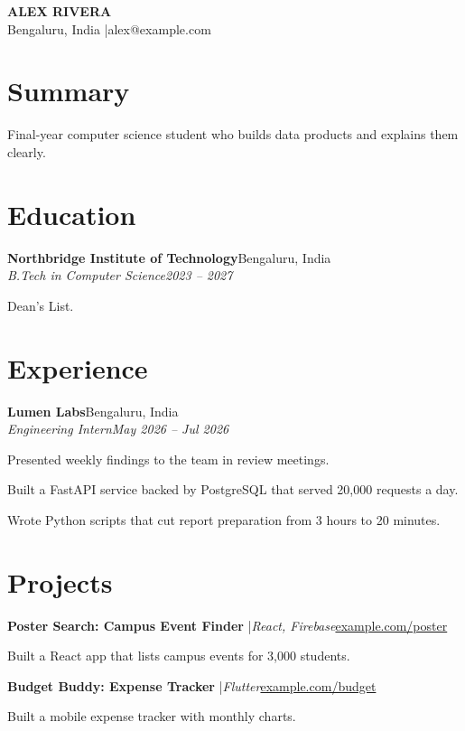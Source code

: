 \documentclass[a4paper,10pt]{article}
\begin{document}
\begin{center}
{\LARGE\bfseries ALEX RIVERA}\\[4pt]
Bengaluru, India \enspace|\enspace alex@example.com
\end{center}

\section{Summary}
Final-year computer science student who builds data products and explains them clearly.

\section{Education}
\noindent\textbf{Northbridge Institute of Technology}\hfill Bengaluru, India\\
\textit{B.Tech in Computer Science}\hfill \textit{2023 – 2027}
\begin{bl}
  \item Dean’s List.
\end{bl}

\section{Experience}
\noindent\textbf{Lumen Labs}\hfill Bengaluru, India\\
\textit{Engineering Intern}\hfill \textit{May 2026 – Jul 2026}
\begin{bl}
  \item Presented weekly findings to the team in review meetings.
  \item Built a FastAPI service backed by PostgreSQL that served 20,000 requests a day.
  \item Wrote Python scripts that cut report preparation from 3 hours to 20 minutes.
\end{bl}

\section{Projects}
\noindent\textbf{Poster Search: Campus Event Finder} \enspace|\enspace \textit{React, Firebase}\hfill \href{https://example.com/poster}{example.com/poster}
\begin{bl}
  \item Built a React app that lists campus events for 3,000 students.
\end{bl}
\vspace{3pt}
\noindent\textbf{Budget Buddy: Expense Tracker} \enspace|\enspace \textit{Flutter}\hfill \href{https://example.com/budget}{example.com/budget}
\begin{bl}
  \item Built a mobile expense tracker with monthly charts.
\end{bl}
\end{document}
